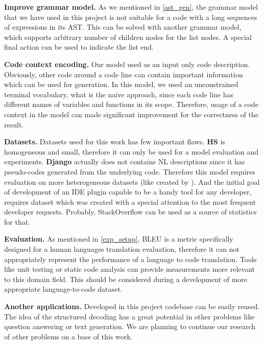 \textbf{Improve grammar model.} As we mentioned in \cref{ast_gen}, the grammar model that we have used in this project is not suitable for a code with a long sequences of expressions in its AST. This can be solved with another grammar model, which supports arbitrary number of children nodes for the list nodes. A special final action can be used to indicate the list end. 

\textbf{Code context encoding.} Our model used as an input only code description. Obviously, other code around a code line can contain important information which can be used for generation. In this model, we used an unconstrained terminal vocabulary, what is the naive approach, since each code line has different names of variables and functions in its scope. Therefore, usage of a code context in the model can made significant improvement for the correctness of the result.

\textbf{Datasets.} Datasets used for this work has few important flaws. \textbf{HS} is homogeneous and small, therefore it can only be used for a model evaluation and experiments. \textbf{Django} actually does not contains NL descriptions since it has pseudo-codes generated from the underlying code. Therefore this model requires evaluation on more heterogeneous datasets (like created by \cite{Barone2017}). And the initial goal of development of an IDE plugin capable to be a handy tool for any developer, requires dataset which was created with a special attention to the most frequent developer requests. Probably, StackOverflow can be used as a source of statistics for that.

\textbf{Evaluation.} As mentioned in \cref{exp_setup}, BLEU is a metric specifically designed for a human languages translation evaluation, therefore it can not appropriately represent the performance of a language to code translation. Tools like unit testing or static code analysis can provide measurements more relevant to this domain field. This should be considered during a development of more appropriate language-to-code dataset.

\textbf{Another applications.} Developed in this project codebase can be easily reused. The idea of the structured decoding has a great potential in other problems like question answering or text generation. We are planning to continue our research of other problems on a base of this work.
